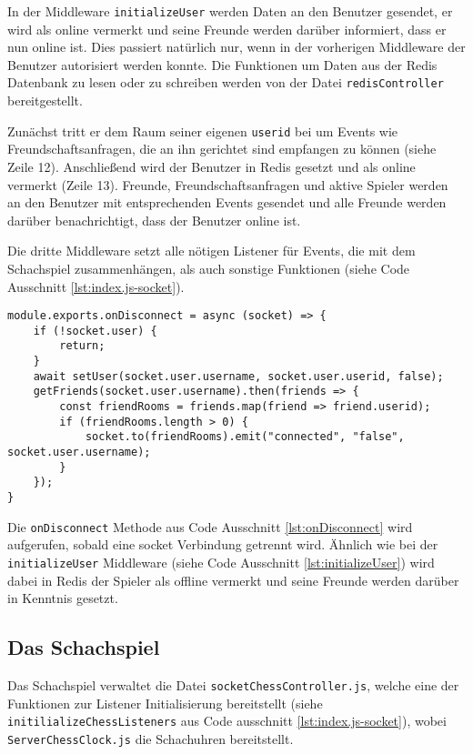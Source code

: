 In der Middleware \verb|initializeUser| werden Daten an den Benutzer gesendet, er wird als online vermerkt und seine Freunde werden darüber informiert, dass er nun online ist. Dies passiert natürlich nur, wenn in der vorherigen Middleware der Benutzer autorisiert werden konnte. Die Funktionen um Daten aus der Redis Datenbank zu lesen oder zu schreiben werden von der Datei \verb|redisController| bereitgestellt.

Zunächst tritt er dem Raum seiner eigenen \verb|userid| bei um Events wie Freundschaftsanfragen, die an ihn gerichtet sind empfangen zu können (siehe Zeile 12). Anschließend wird der Benutzer in Redis gesetzt und als online vermerkt (Zeile 13). Freunde, Freundschaftsanfragen und aktive Spieler werden an den Benutzer mit entsprechenden Events gesendet und alle Freunde werden darüber benachrichtigt, dass der Benutzer online ist.

Die dritte Middleware setzt alle nötigen Listener für Events, die mit dem Schachspiel zusammenhängen, als auch sonstige Funktionen (siehe Code Ausschnitt \ref{lst:index.js-socket}).

\begin{lstlisting}[style=codeStyle, caption={Die onDisconnect Methode für Sockets}, label={lst:onDisconnect}]
module.exports.onDisconnect = async (socket) => {
    if (!socket.user) {
        return;
    }
    await setUser(socket.user.username, socket.user.userid, false);
    getFriends(socket.user.username).then(friends => {
        const friendRooms = friends.map(friend => friend.userid);
        if (friendRooms.length > 0) {
            socket.to(friendRooms).emit("connected", "false", socket.user.username);
        }
    });
}
\end{lstlisting}

Die \verb|onDisconnect| Methode aus Code Ausschnitt \ref{lst:onDisconnect} wird aufgerufen, sobald eine socket Verbindung getrennt wird. Ähnlich wie bei der \verb|initializeUser| Middleware (siehe Code Ausschnitt \ref{lst:initializeUser}) wird dabei in Redis der Spieler als offline vermerkt und seine Freunde werden darüber in Kenntnis gesetzt.


\subsection{Das Schachspiel}
Das Schachspiel verwaltet die Datei \verb|socketChessController.js|, welche eine der Funktionen zur Listener Initialisierung bereitstellt (siehe \verb|initilializeChessListeners| aus Code ausschnitt \ref{lst:index.js-socket}), wobei \verb|ServerChessClock.js| die Schachuhren bereitstellt.


